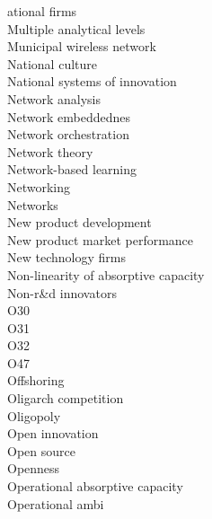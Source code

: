 \documentclass[a4paper]{article}
\begin{document}
\begin{multicols*}{2}
\begin{footnotesize}
ational firms \\ Multiple analytical levels \\ Municipal wireless network \\ National culture \\ National systems of innovation \\ Network analysis \\ Network embeddednes \\ Network orchestration \\ Network theory \\ Network-based learning \\ Networking \\ Networks \\ New product development \\ New product market performance \\ New technology firms \\ Non-linearity of absorptive capacity \\ Non-r\&d innovators \\ O30 \\ O31 \\ O32 \\ O47 \\ Offshoring \\ Oligarch competition \\ Oligopoly \\ Open innovation \\ Open source \\ Openness \\ Operational absorptive capacity \\ Operational ambi
\end{footnotesize}
\end{multicols*}
\end{document}
